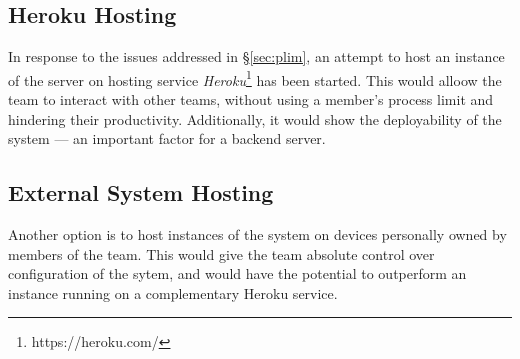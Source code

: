 \subsection{Heroku Hosting}\label{sec:her}
In response to the issues addressed in \S\ref{sec:plim}, an attempt to host
an instance of the server on hosting service
\emph{Heroku}\footnote{https://heroku.com/} has been started. This would
alloow the team to interact with other teams, without using a member's
process limit and hindering their productivity. Additionally, it would show
the deployability of the system --- an important factor for a backend
server.

\subsection{External System Hosting}\label{sec:ext}
Another option is to host instances of the system on devices personally
owned by members of the team. This would give the team absolute control over
configuration of the sytem, and would have the potential to outperform an
instance running on a complementary Heroku service.

